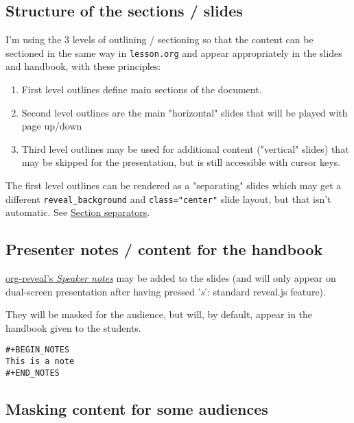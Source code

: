 \documentclass[a4paper]{article}
\begin{document}
\subsection{Structure of the sections / slides}
\label{sec:org7e44ce0}

I'm using the 3 levels of outlining / sectioning so that the content can be sectioned in the same way in \texttt{lesson.org} and appear appropriately in the slides and handbook, with these principles:

\begin{enumerate}
\item First level outlines define main sections of the document.
\item Second level outlines are the main "horizontal" slides that will be played with page up/down
\item Third level outlines may be used for additional content ("vertical" slides) that may be skipped for the presentation, but is still accessible with cursor keys.
\end{enumerate}

\begin{NOTES}
The first level outlines can be rendered as a "separating" slides which may get a different \texttt{reveal\_background} and \texttt{class="center"} slide layout, but that isn't automatic. See \hyperref[sec:orgf5cabfe]{Section separators}.
\end{NOTES}

\subsection{Presenter notes / content for the handbook}
\label{sec:orgbba0bb4}

\href{https://github.com/yjwen/org-reveal/\#speaker-notes}{org-reveal's \emph{Speaker notes}} may be added to the slides (and will only appear on
dual-screen presentation after having pressed '\emph{s}': standard reveal.js
feature).

They will be masked for the audience, but will, by default, appear in the handbook given to the students.

\begin{verbatim}
#+BEGIN_NOTES
This is a note
#+END_NOTES
\end{verbatim}

\subsection{Masking content for some audiences}
\label{sec:org971916b}
\end{document}

